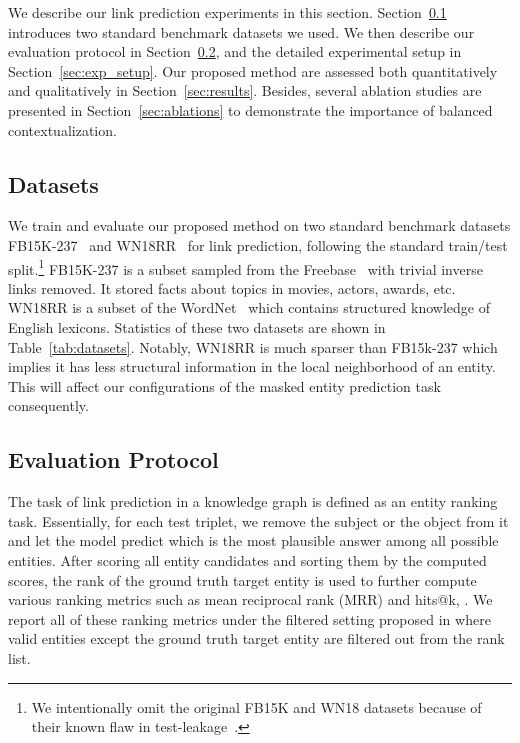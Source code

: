\documentclass[11pt]{article}
\begin{document}
 We describe our link prediction experiments in this section.
Section~\ref{sec:datasets} introduces two standard benchmark datasets we used.
We then describe our evaluation protocol in Section~\ref{sec:eval_protocal}, and the detailed experimental setup in Section~\ref{sec:exp_setup}. 
Our proposed method are assessed both quantitatively and qualitatively in Section~\ref{sec:results}.
Besides, several ablation studies are presented in Section~\ref{sec:ablations} to demonstrate the importance of balanced contextualization.

\subsection{Datasets}
\label{sec:datasets}
We train and evaluate our proposed method on two standard benchmark datasets FB15K-237~\cite{toutanova-chen-2015-observed} and WN18RR~\cite{dettmers2018conve} for link prediction, following the standard train/test split.\footnote{We intentionally omit the original FB15K and WN18 datasets because of their known flaw in test-leakage~\cite{toutanova-chen-2015-observed}.}
FB15K-237 is a subset sampled from the Freebase~\cite{bollacker2008freebase} with trivial inverse links removed.
It stored facts about topics in movies, actors, awards, etc.
WN18RR is a subset of the WordNet~\cite{miller1995wordnet} which contains structured knowledge of English lexicons.
Statistics of these two datasets are shown in Table~\ref{tab:datasets}.
Notably, WN18RR is much sparser than FB15k-237 which implies it has less structural information in the local neighborhood of an entity.
This will affect our configurations of the masked entity prediction task consequently.


\subsection{Evaluation Protocol}
\label{sec:eval_protocal}
The task of link prediction in a knowledge graph is defined as an entity ranking task.
Essentially, for each test triplet, we remove the subject or the object from it and let the model predict which is the most plausible answer among all possible entities.
After scoring all entity candidates and sorting them by the computed scores, the rank of the ground truth target entity is used to further compute various ranking metrics such as mean reciprocal rank (MRR) and hits@k, .
We report all of these ranking metrics under the filtered setting proposed in \citet{bordes2013transe} where valid entities except the ground truth target entity are filtered out from the rank list.
\end{document}
